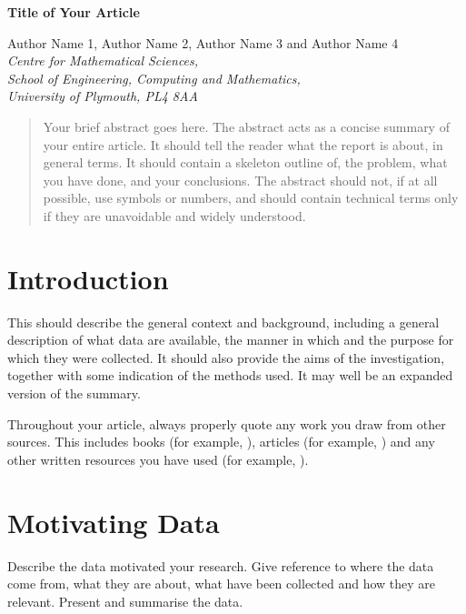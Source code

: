 \documentclass[a4paper,amsmath, 12pt]{article}
\begin{document}
\begin{center}
\textbf{\Large Title of Your Article}

\vspace{0.5cm}

Author Name 1, Author Name 2,  Author Name 3 and Author Name 4 \\

{\it Centre for Mathematical Sciences, \\ School of Engineering, Computing and Mathematics, \\ University of Plymouth, PL4 8AA}
\end{center}


\begin{abstract}
\noindent
Your brief abstract goes here. The abstract acts as a concise summary of your entire article. It should tell the reader what the report is about, in general terms. It should contain a skeleton
outline of,  the problem, what you have done, and your conclusions. The abstract should not, if at all possible, use symbols or numbers, and should contain technical terms only if they are unavoidable and widely understood.

\end{abstract}


\section{Introduction}
This should describe the general context and background, including a general
description of what data are available, the manner in which and the purpose for
which they were collected.  It should also provide the aims of the investigation,
together with some indication of the methods used. It may well be an expanded
version of the summary.

Throughout your article, always properly quote any work you draw from other sources. This includes books (for example, \cite{james:2013} ), articles (for example, \cite{Seiichiro:2011}) and any other written resources you have used (for example, \cite{ONS}). \\

\section{Motivating Data}

Describe the data motivated your research. Give reference to where the data come from, what they are about, what have been collected and how they are relevant. Present and summarise the data.
\end{document}
